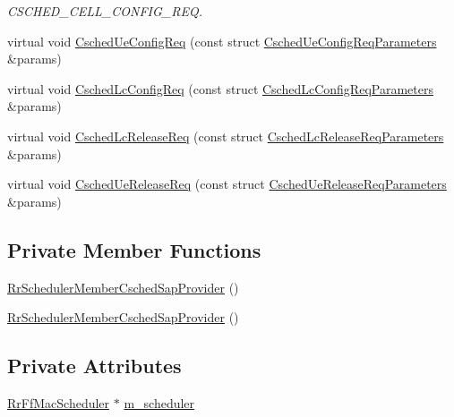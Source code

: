 \begin{DoxyCompactItemize}
\begin{DoxyCompactList}\small\item\em C\+S\+C\+H\+E\+D\+\_\+\+C\+E\+L\+L\+\_\+\+C\+O\+N\+F\+I\+G\+\_\+\+R\+EQ. \end{DoxyCompactList}\item 
virtual void \hyperlink{classns3_1_1RrSchedulerMemberCschedSapProvider_a03199d172f4ce22067ce86375ec5bc2d}{Csched\+Ue\+Config\+Req} (const struct \hyperlink{structns3_1_1FfMacCschedSapProvider_1_1CschedUeConfigReqParameters}{Csched\+Ue\+Config\+Req\+Parameters} \&params)
\item 
virtual void \hyperlink{classns3_1_1RrSchedulerMemberCschedSapProvider_a3ff69bfaeedb3b2426e3425a4729defe}{Csched\+Lc\+Config\+Req} (const struct \hyperlink{structns3_1_1FfMacCschedSapProvider_1_1CschedLcConfigReqParameters}{Csched\+Lc\+Config\+Req\+Parameters} \&params)
\item 
virtual void \hyperlink{classns3_1_1RrSchedulerMemberCschedSapProvider_a01c1afa8c7a219a49ffa29a804e1218b}{Csched\+Lc\+Release\+Req} (const struct \hyperlink{structns3_1_1FfMacCschedSapProvider_1_1CschedLcReleaseReqParameters}{Csched\+Lc\+Release\+Req\+Parameters} \&params)
\item 
virtual void \hyperlink{classns3_1_1RrSchedulerMemberCschedSapProvider_af839bd761a9a718abec03fe6b0207109}{Csched\+Ue\+Release\+Req} (const struct \hyperlink{structns3_1_1FfMacCschedSapProvider_1_1CschedUeReleaseReqParameters}{Csched\+Ue\+Release\+Req\+Parameters} \&params)
\end{DoxyCompactItemize}
\subsection*{Private Member Functions}
\begin{DoxyCompactItemize}
\item 
\hyperlink{classns3_1_1RrSchedulerMemberCschedSapProvider_a82ccf92b07332cdcd8679c93d81cf9ab}{Rr\+Scheduler\+Member\+Csched\+Sap\+Provider} ()
\item 
\hyperlink{classns3_1_1RrSchedulerMemberCschedSapProvider_a82ccf92b07332cdcd8679c93d81cf9ab}{Rr\+Scheduler\+Member\+Csched\+Sap\+Provider} ()
\end{DoxyCompactItemize}
\subsection*{Private Attributes}
\begin{DoxyCompactItemize}
\item 
\hyperlink{classns3_1_1RrFfMacScheduler}{Rr\+Ff\+Mac\+Scheduler} $\ast$ \hyperlink{classns3_1_1RrSchedulerMemberCschedSapProvider_ad0f450676ef79b1f6b6e12add00be184}{m\+\_\+scheduler}
\end{DoxyCompactItemize}


